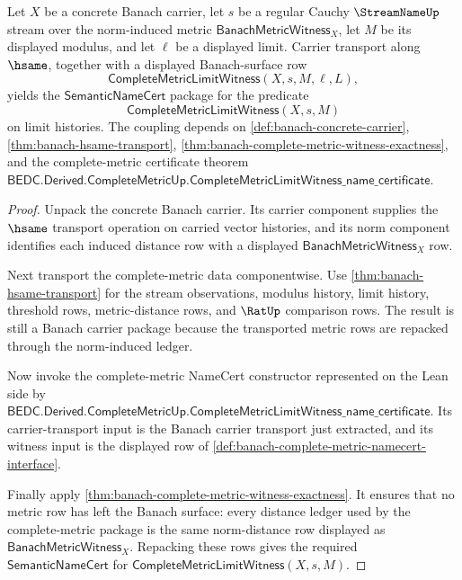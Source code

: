 \begin{theorem}
\label{thm:banach-complete-metric-namecert-coupling}
Let $X$ be a concrete Banach carrier, let $s$ be a regular Cauchy
$\StreamNameUp$ stream over the norm-induced metric
$\mathsf{BanachMetricWitness}_X$, let $M$ be its displayed modulus, and let
$\ell$ be a displayed limit. Carrier transport along $\hsame$, together with a
displayed Banach-surface row
$$
\mathsf{CompleteMetricLimitWitness}(X,s,M,\ell,L),
$$
yields the $\mathsf{SemanticNameCert}$ package for the predicate
$$
\mathsf{CompleteMetricLimitWitness}(X,s,M)
$$
on limit histories. The coupling depends on
\autoref{def:banach-concrete-carrier}, \autoref{thm:banach-hsame-transport},
\autoref{thm:banach-complete-metric-witness-exactness}, and the complete-metric
certificate theorem
$\mathsf{BEDC.Derived.CompleteMetricUp.CompleteMetricLimitWitness\_name\_certificate}$.
\end{theorem}
\begin{proof}
Unpack the concrete Banach carrier. Its carrier component supplies the
$\hsame$ transport operation on carried vector histories, and its norm component
identifies each induced distance row with a displayed
$\mathsf{BanachMetricWitness}_X$ row.

Next transport the complete-metric data componentwise. Use
\autoref{thm:banach-hsame-transport} for the stream observations, modulus
history, limit history, threshold rows, metric-distance rows, and $\RatUp$
comparison rows. The result is still a Banach carrier package because the
transported metric rows are repacked through the norm-induced ledger.

Now invoke the complete-metric NameCert constructor represented on the Lean
side by
$\mathsf{BEDC.Derived.CompleteMetricUp.CompleteMetricLimitWitness\_name\_certificate}$.
Its carrier-transport input is the Banach carrier transport just extracted, and
its witness input is the displayed row of
\autoref{def:banach-complete-metric-namecert-interface}.

Finally apply \autoref{thm:banach-complete-metric-witness-exactness}. It
ensures that no metric row has left the Banach surface: every distance ledger
used by the complete-metric package is the same norm-distance row displayed as
$\mathsf{BanachMetricWitness}_X$. Repacking these rows gives the required
$\mathsf{SemanticNameCert}$ for
$\mathsf{CompleteMetricLimitWitness}(X,s,M)$.
\end{proof}

